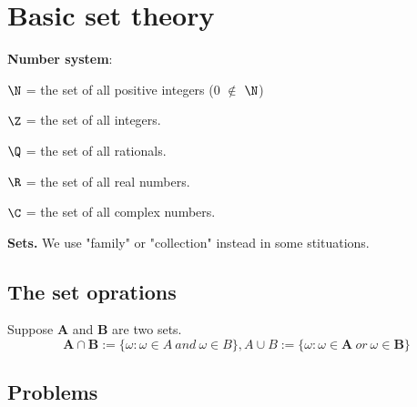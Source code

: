 \newpage
\section{Basic set theory}


\textbf{Number system}:
\begin{list}{}{Here are some fluquently used notions:}
\item $\N$ = the set of all positive integers (0 $\notin$ $\N$)
\item $\Z$ = the set of all integers.
\item $\Q$ = the set of all rationals.
\item $\R$ = the set of all real numbers.
\item $\C$ = the set of all complex numbers.
\end{list}

\textbf{Sets.} We use "family" or "collection" instead in some stituations.

\subsection{The set oprations}

Suppose \textbf{A} and \textbf{B} are two sets.
$$
\textbf{A} \cap \textbf{B} := \{\omega : \omega \in A \ and\  \omega \in B \}, A \cup B := \{\omega: \omega \in \textbf{A} \ or\  \omega \in \textbf{B}\}
$$


\newpage
\subsection*{Problems}
